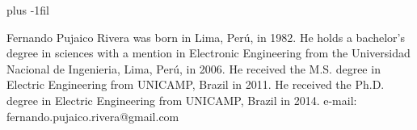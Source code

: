 \documentclass[letterpaper, 10 pt,conference]{ieeeconf}  %
\begin{document}
\vskip 0pt plus -1fil
\begin{biography}{Fernando Pujaico Rivera}
was born in Lima, Perú, in 1982. 
He holds a
bachelor’s degree in sciences with a mention in Electronic Engineering from the
Universidad Nacional de Ingenieria, Lima, Perú, in 2006. 
He received the M.S. degree in Electric Engineering from UNICAMP, Brazil in 2011. 
He received the Ph.D. degree in Electric Engineering from UNICAMP, Brazil in 2014. 
e-mail: fernando.pujaico.rivera@gmail.com
\end{biography}
\end{document}
